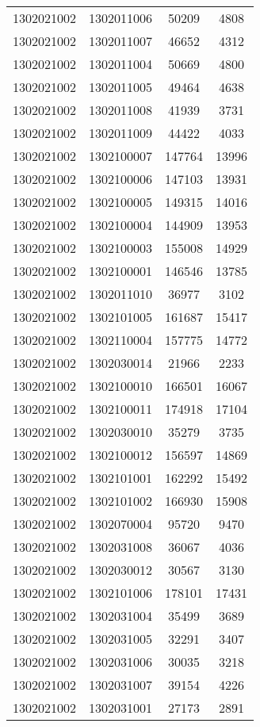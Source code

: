\begin{longtable}[h]{llcc}
		1302021002 & 1302011006 & 50209 & 4808\\
		1302021002 & 1302011007 & 46652 & 4312\\
		1302021002 & 1302011004 & 50669 & 4800\\
		1302021002 & 1302011005 & 49464 & 4638\\
		1302021002 & 1302011008 & 41939 & 3731\\
		1302021002 & 1302011009 & 44422 & 4033\\
		1302021002 & 1302100007 & 147764 & 13996\\
		1302021002 & 1302100006 & 147103 & 13931\\
		1302021002 & 1302100005 & 149315 & 14016\\
		1302021002 & 1302100004 & 144909 & 13953\\
		1302021002 & 1302100003 & 155008 & 14929\\
		1302021002 & 1302100001 & 146546 & 13785\\
		1302021002 & 1302011010 & 36977 & 3102\\
		1302021002 & 1302101005 & 161687 & 15417\\
		1302021002 & 1302110004 & 157775 & 14772\\
		1302021002 & 1302030014 & 21966 & 2233\\
		1302021002 & 1302100010 & 166501 & 16067\\
		1302021002 & 1302100011 & 174918 & 17104\\
		1302021002 & 1302030010 & 35279 & 3735\\
		1302021002 & 1302100012 & 156597 & 14869\\
		1302021002 & 1302101001 & 162292 & 15492\\
		1302021002 & 1302101002 & 166930 & 15908\\
		1302021002 & 1302070004 & 95720 & 9470\\
		1302021002 & 1302031008 & 36067 & 4036\\
		1302021002 & 1302030012 & 30567 & 3130\\
		1302021002 & 1302101006 & 178101 & 17431\\
		1302021002 & 1302031004 & 35499 & 3689\\
		1302021002 & 1302031005 & 32291 & 3407\\
		1302021002 & 1302031006 & 30035 & 3218\\
		1302021002 & 1302031007 & 39154 & 4226\\
		1302021002 & 1302031001 & 27173 & 2891\\

\end{longtable}
